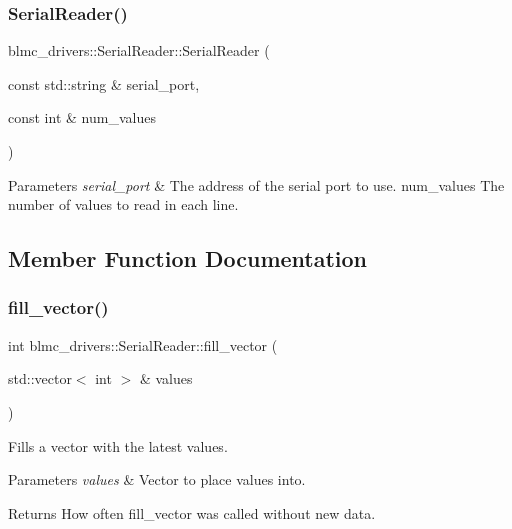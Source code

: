 \subsubsection{\texorpdfstring{Serial\+Reader()}{SerialReader()}}
{\footnotesize\ttfamily blmc\+\_\+drivers\+::\+Serial\+Reader\+::\+Serial\+Reader (\begin{DoxyParamCaption}\item[{const std\+::string \&}]{serial\+\_\+port,  }\item[{const int \&}]{num\+\_\+values }\end{DoxyParamCaption})}


\begin{DoxyParams}{Parameters}
{\em serial\+\_\+port} & The address of the serial port to use.  num\+\_\+values The number of values to read in each line. \\
\hline
\end{DoxyParams}


\subsection{Member Function Documentation}
\mbox{\label{classblmc__drivers_1_1SerialReader_aa590c82f97cfa6d9222bc3d19952f166}} 
\subsubsection{\texorpdfstring{fill\+\_\+vector()}{fill\_vector()}}
{\footnotesize\ttfamily int blmc\+\_\+drivers\+::\+Serial\+Reader\+::fill\+\_\+vector (\begin{DoxyParamCaption}\item[{std\+::vector$<$ int $>$ \&}]{values }\end{DoxyParamCaption})}



Fills a vector with the latest values. 


\begin{DoxyParams}{Parameters}
{\em values} & Vector to place values into. \\
\hline
\end{DoxyParams}
\begin{DoxyReturn}{Returns}
How often fill\+\_\+vector was called without new data. 
\end{DoxyReturn}
\mbox{\label{classblmc__drivers_1_1SerialReader_aaa18311d9c274b0ac8a8bd86a311d3fc}} 
